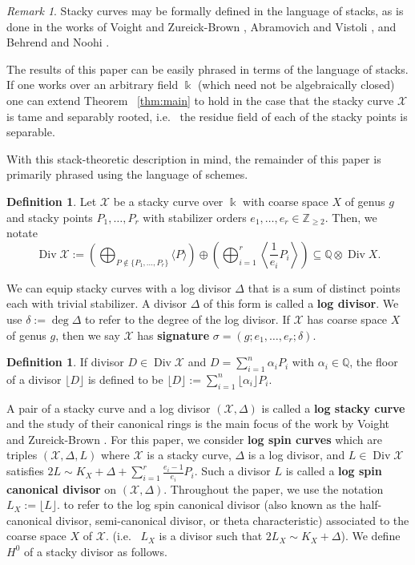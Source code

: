 \documentclass{amsart}
\theoremstyle{plain}
\theoremstyle{definition}
\newtheorem{defn}[thm]{Definition}
\theoremstyle{remark}
\newtheorem{rem}[thm]{Remark}
\numberwithin{equation}{section}
\newcommand\BQ{{\mathbb Q}}
\newcommand\BZ{{\mathbb Z}}
\newcommand\Bk{{\Bbbk}}
\DeclareMathOperator\di{Div}
\newcommand\sx{\mathscr X}
\newcommand{\halfcan}{L}
\begin{document}
\begin{rem}
\label{rem:stack-formalism}
Stacky curves may be formally defined in the language of stacks, as
is done in the works of Voight and Zureick-Brown \cite{vzb:stacky},
Abramovich and Vistoli \cite{abramovich-vistoli:compactifying}, and
Behrend and Noohi \cite{behrend-noohi:uniformization}.

The results of this paper can be easily phrased in terms of the language of stacks. If one works over an arbitrary field $\Bk$ (which need not be algebraically closed) one can extend Theorem ~\ref{thm:main} to hold in the case that the stacky curve $\sx$ is tame and separably rooted, i.e.~ the residue field of each
of the stacky points is separable.

With this stack-theoretic description in mind, the remainder of this paper is primarily phrased using the language
of schemes.
\end{rem}

\begin{defn}
\label{defn:div-ex}
Let $\sx$ be a stacky curve over $\Bk$ with coarse space $X$ of genus $g$ and stacky points $P_1, \ldots,
P_r$ with stabilizer orders $e_1, \ldots, e_r \in \BZ_{\geq 2}$.
Then, we notate
\[
	\di \sx := \left(\bigoplus_{P\notin \{P_1, \ldots, P_r\}} \langle 
	P \rangle \right) \oplus \left(\bigoplus_{i = 1}^r \left \langle 
	\frac{1}{e_i}P_i \right \rangle \right) \subseteq \BQ \otimes \di X.
\]
\end{defn}

We can equip stacky curves with a log divisor $\Delta$ that is a 
sum of distinct points each with trivial stabilizer. 
A divisor
$\Delta$ of this form is called a \textbf{log divisor}. We use
$\delta := \deg \Delta$ to refer to the degree of the log divisor.
If $\sx$ has coarse space $X$ of genus $g$, then we say $\sx$ has
\textbf{signature} $\sigma = (g; e_1, \ldots, e_r; \delta)$.

\begin{defn}
\label{defn:divisor-floor}
If divisor $D \in \di \sx$ and $D = \sum_{i = 1}^{n} \alpha_i P_i$
with $\alpha_i \in \BQ$, the floor of a divisor $\lfloor D
\rfloor$ is defined to be $\lfloor D \rfloor := \sum_{i = 1}^{n}
\lfloor \alpha_i \rfloor P_i$.
\end{defn}

A pair of a stacky curve and a log divisor $(\sx, \Delta)$ is
called a \textbf{log stacky curve} and the study of their
canonical rings is the main focus of the work by Voight and 
Zureick-Brown \cite{vzb:stacky}. For this paper, we consider \textbf{log
spin curves} which are triples $(\sx, \Delta, \halfcan)$ where $\sx$
is a stacky curve, $\Delta$ is a log divisor, and $\halfcan \in \di
\sx$ satisfies $2 \halfcan \sim K_X + \Delta + \sum_{i = 1}^{r}
\frac{e_i - 1}{e_i} P_i$. Such a divisor $\halfcan$ is called a
\textbf{log spin canonical divisor} on $(\sx, \Delta)$. Throughout the paper, we use
the notation $\halfcan_X := \lfloor L \rfloor.$ to refer to the log spin
canonical divisor (also known as the half-canonical divisor, 
semi-canonical divisor, or theta characteristic) associated to the
coarse space $X$ of $\sx.$  (i.e.~ $\halfcan_X$ is a divisor such
that $2\halfcan_X \sim K_X + \Delta$). 
We define $H^0$ of a stacky divisor as follows.
\end{document}
